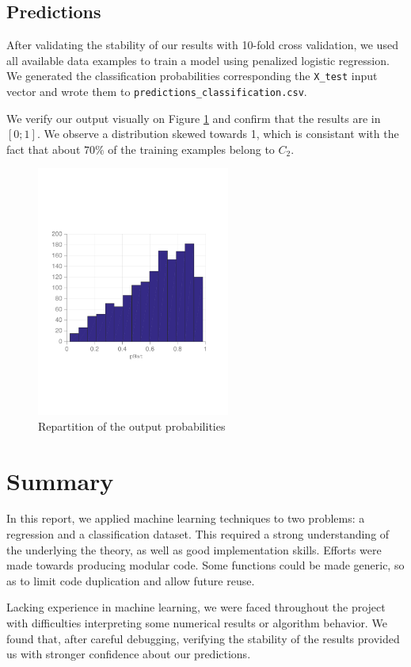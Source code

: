 \documentclass{article} %
\begin{document}
  \subsection{Predictions}
  After validating the stability of our results with 10-fold cross validation, we used all available data examples to train a model using penalized logistic regression. We generated the classification probabilities corresponding the \texttt{X\_test} input vector and wrote them to \texttt{predictions\_classification.csv}.

  We verify our output visually on Figure \ref{fig:classification-output} and confirm that the results are in $[0; 1]$. We observe a distribution skewed towards 1, which is consistant with the fact that about $70\%$ of the training examples belong to $C_2$.

  \begin{figure}[ht]
    \center
    \includegraphics[width=2.5in]{figures/classification/output-phat.pdf}
    \caption{Repartition of the output probabilities}
    \label{fig:classification-output}
  \end{figure}

\section{Summary}
In this report, we applied machine learning techniques to two problems: a regression and a classification dataset. This required a strong understanding of the underlying the theory, as well as good implementation skills. Efforts were made towards producing modular code. Some functions could be made generic, so as to limit code duplication and allow future reuse.

Lacking experience in machine learning, we were faced throughout the project with difficulties interpreting some numerical results or algorithm behavior. We found that, after careful debugging, verifying the stability of the results provided us with stronger confidence about our predictions.
\end{document}
